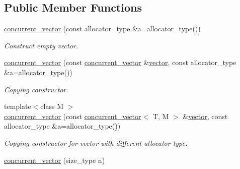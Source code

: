 \subsection*{Public Member Functions}
\begin{DoxyCompactItemize}
\item 
\hypertarget{classtbb_1_1concurrent__vector_af063f99de453079891c5a9e7e04ac633}{}\hyperlink{classtbb_1_1concurrent__vector_af063f99de453079891c5a9e7e04ac633}{concurrent\+\_\+vector} (const allocator\+\_\+type \&a=allocator\+\_\+type())\label{classtbb_1_1concurrent__vector_af063f99de453079891c5a9e7e04ac633}

\begin{DoxyCompactList}\small\item\em Construct empty vector. \end{DoxyCompactList}\item 
\hypertarget{classtbb_1_1concurrent__vector_a4b3346a8f1f904be6d83447b38684fbe}{}\hyperlink{classtbb_1_1concurrent__vector_a4b3346a8f1f904be6d83447b38684fbe}{concurrent\+\_\+vector} (const \hyperlink{classtbb_1_1concurrent__vector}{concurrent\+\_\+vector} \&\hyperlink{structvector}{vector}, const allocator\+\_\+type \&a=allocator\+\_\+type())\label{classtbb_1_1concurrent__vector_a4b3346a8f1f904be6d83447b38684fbe}

\begin{DoxyCompactList}\small\item\em Copying constructor. \end{DoxyCompactList}\item 
\hypertarget{classtbb_1_1concurrent__vector_ad6e96b766551ebe441e2b1bb7ea32abe}{}{\footnotesize template$<$class M $>$ }\\\hyperlink{classtbb_1_1concurrent__vector_ad6e96b766551ebe441e2b1bb7ea32abe}{concurrent\+\_\+vector} (const \hyperlink{classtbb_1_1concurrent__vector}{concurrent\+\_\+vector}$<$ T, M $>$ \&\hyperlink{structvector}{vector}, const allocator\+\_\+type \&a=allocator\+\_\+type())\label{classtbb_1_1concurrent__vector_ad6e96b766551ebe441e2b1bb7ea32abe}

\begin{DoxyCompactList}\small\item\em Copying constructor for vector with different allocator type. \end{DoxyCompactList}\item 
\hypertarget{classtbb_1_1concurrent__vector_a2ec1559f644381afec01494544994811}{}\hyperlink{classtbb_1_1concurrent__vector_a2ec1559f644381afec01494544994811}{concurrent\+\_\+vector} (size\+\_\+type n)\label{classtbb_1_1concurrent__vector_a2ec1559f644381afec01494544994811}


\end{DoxyCompactItemize}
